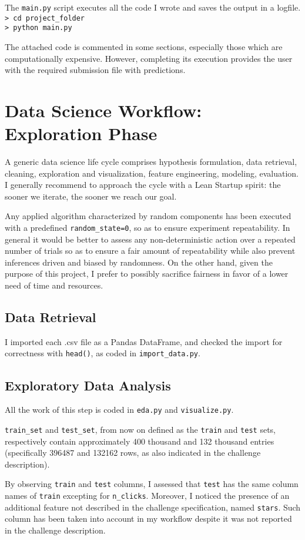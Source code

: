 \documentclass[preprint,12pt,3p]{elsarticle}
\begin{document}
The \verb|main.py| script executes all the code I wrote and saves the output in a logfile.
\verb|> cd project_folder|\\
\verb|> python main.py|

The attached code is commented in some sections, especially those which are computationally expensive. However, completing its execution provides the user with the required submission file with predictions.

\section{Data Science Workflow: Exploration Phase}
A generic data science life cycle comprises hypothesis formulation, data retrieval, cleaning, exploration and visualization, feature engineering, modeling, evaluation. I generally recommend to approach the cycle with a Lean Startup spirit: the sooner we iterate, the sooner we reach our goal.

Any applied algorithm characterized by random components has been executed with a predefined \verb|random_state=0|, so as to ensure experiment repeatability. In general it would be better to assess any non-deterministic action over a repeated number of trials so as to ensure a fair amount of repeatability while also prevent inferences driven and biased by randomness. On the other hand, given the purpose of this project, I prefer to possibly sacrifice fairness in favor of a lower need of time and resources.

\subsection{Data Retrieval}
I imported each .csv file as a Pandas DataFrame, and checked the import for correctness with \verb|head()|, as coded in \verb|import_data.py|.

\subsection{Exploratory Data Analysis}
All the work of this step is coded in \verb|eda.py| and \verb|visualize.py|.

\verb|train_set| and \verb|test_set|, from now on defined as the \verb|train| and \verb|test| sets, respectively contain approximately 400 thousand and 132 thousand entries (specifically 396487 and 132162 rows, as also indicated in the challenge description).

By observing \verb|train| and \verb|test| columns, I assessed that \verb|test| has the same column names of \verb|train| excepting for \verb|n_clicks|. Moreover, I noticed the presence of an additional feature not described in the challenge specification, named \verb|stars|. Such column has been taken into account in my workflow despite it was not reported in the challenge description.
\end{document}
